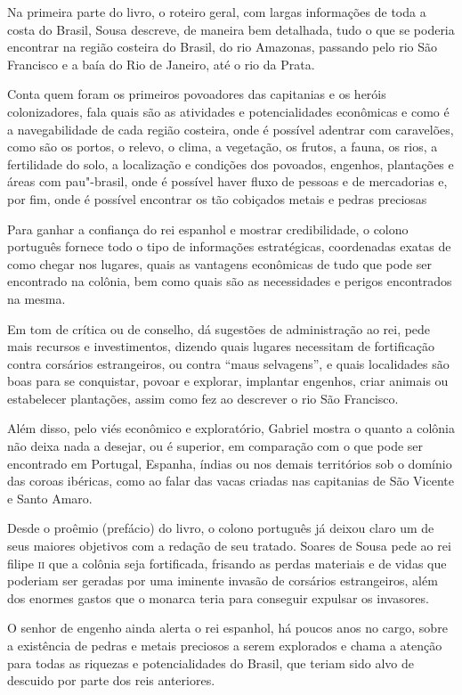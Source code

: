 \documentclass[12pt]{extarticle}
\begin{document}
Na primeira parte do livro, o roteiro geral, com largas informações de
toda a costa do Brasil, Sousa descreve, de maneira bem detalhada, tudo o
que se poderia encontrar na região costeira do Brasil, do rio Amazonas,
passando pelo rio São Francisco e a baía do Rio de Janeiro, até o rio da
Prata.

Conta quem foram os primeiros povoadores das capitanias e os heróis
colonizadores, fala quais são as atividades e potencialidades econômicas
e como é a navegabilidade de cada região costeira, onde é possível
adentrar com caravelões, como são os portos, o relevo, o clima, a
vegetação, os frutos, a fauna, os rios, a fertilidade do solo, a
localização e condições dos povoados, engenhos, plantações e áreas com
pau"-brasil, onde é possível haver fluxo de pessoas e de mercadorias e,
por fim, onde é possível encontrar os tão cobiçados metais e pedras
preciosas

Para ganhar a confiança do rei espanhol e mostrar credibilidade, o
colono português fornece todo o tipo de informações estratégicas,
coordenadas exatas de como chegar nos lugares, quais as vantagens
econômicas de tudo que pode ser encontrado na colônia, bem como quais
são as necessidades e perigos encontrados na mesma.

Em tom de crítica ou de conselho, dá sugestões de administração ao rei,
pede mais recursos e investimentos, dizendo quais lugares necessitam de
fortificação contra corsários estrangeiros, ou contra ``maus
selvagens'', e quais localidades são boas para se conquistar, povoar e
explorar, implantar engenhos, criar animais ou estabelecer plantações,
assim como fez ao descrever o rio São Francisco.

Além disso, pelo viés econômico e exploratório, Gabriel mostra o quanto
a colônia não deixa nada a desejar, ou é superior, em comparação com o
que pode ser encontrado em Portugal, Espanha, índias ou nos demais
territórios sob o domínio das coroas ibéricas, como ao falar das vacas
criadas nas capitanias de São Vicente e Santo Amaro.

Desde o proêmio (prefácio) do livro, o colono português já deixou claro
um de seus maiores objetivos com a redação de seu tratado.
Soares de Sousa pede ao rei filipe \textsc{ii} que a colônia seja fortificada,
frisando as perdas materiais e de vidas que poderiam ser geradas por uma
iminente invasão de corsários estrangeiros, além dos enormes gastos que
o monarca teria para conseguir expulsar os invasores.

O senhor de engenho ainda alerta o rei espanhol, há poucos anos no
cargo, sobre a existência de pedras e metais preciosos a serem
explorados e chama a atenção para todas as riquezas e potencialidades do
Brasil, que teriam sido alvo de descuido por parte dos reis anteriores.
\end{document}
